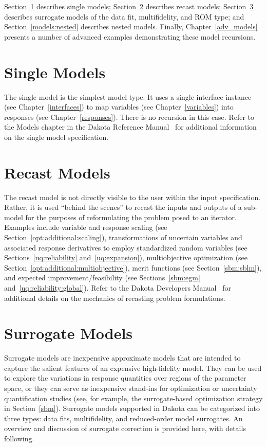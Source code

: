 Section~\ref{models:single} describes single models;
Section~\ref{models:recast} describes recast models;
Section~\ref{models:surrogate} describes surrogate models of the data
fit, multifidelity, and ROM type; and Section~\ref{models:nested}
describes nested models.  Finally, Chapter~\ref{adv_models} presents
a number of advanced examples demonstrating these model recursions.

\section{Single Models}\label{models:single}

The single model is the simplest model type.  It uses a single
interface instance (see Chapter~\ref{interfaces}) to map variables
(see Chapter~\ref{variables}) into responses (see
Chapter~\ref{responses}).  There is no recursion in this case.  Refer
to the Models chapter in the Dakota Reference Manual~\cite{RefMan} for
additional information on the single model specification.

\section{Recast Models}\label{models:recast}

The recast model is not directly visible to the user within the input
specification.  Rather, it is used ``behind the scenes'' to recast the
inputs and outputs of a sub-model for the purposes of reformulating
the problem posed to an iterator.  Examples include variable and
response scaling (see Section~\ref{opt:additional:scaling}),
transformations of uncertain variables and associated response
derivatives to employ standardized random variables (see
Sections~\ref{uq:reliability} and~\ref{uq:expansion}), multiobjective
optimization (see Section~\ref{opt:additional:multiobjective}), merit
functions (see Section~\ref{sbm:sblm}), and expected
improvement/feasibility (see Sections~\ref{sbm:egm}
and~\ref{uq:reliability:global}).  Refer to the Dakota Developers
Manual~\cite{DevMan} for additional details on the mechanics of
recasting problem formulations.

\section{Surrogate Models}\label{models:surrogate}

Surrogate models are inexpensive approximate models that are intended
to capture the salient features of an expensive high-fidelity model.
They can be used to explore the variations in response quantities over
regions of the parameter space, or they can serve as inexpensive
stand-ins for optimization or uncertainty quantification studies (see,
for example, the surrogate-based optimization strategy in
Section~\ref{sbm}).  Surrogate models supported in Dakota can be
categorized into three types: data fits, multifidelity, and
reduced-order model surrogates.  An overview and discussion of
surrogate correction is provided here, with details following.

